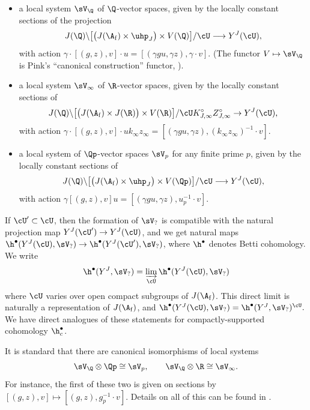 \documentclass[10pt,reqno,a4paper]{amsart}
\newcommand{\subf}{_{\mathrm{f}}}
\begin{document}
\begin{itemize}

\item a local system $\sV_{\Q}$ of $\Q$-vector spaces, given by the locally constant sections of the projection
\[
J(\Q) \backslash\big[\big(J(\A\subf) \times \uhp_{J}\big) \times  V(\Q)\big]/\cU \longrightarrow Y^J(\cU),
\]
with action $\gamma \cdot [(g,z),v] \cdot u = [(\gamma gu, \gamma z), \gamma \cdot v]$. (The functor $V \mapsto \sV_{\Q}$ is Pink's ``canonical construction'' functor, \cite{pink90}).

\item a local system $\sV_{\infty}$ of $\R$-vector spaces, given by the locally constant sections of
\[ J(\Q) \backslash\big[\big(J(\A\subf) \times J(\R)\big) \times  V(\R)\big]/\cU K_{J,\infty}^{\circ} Z_{J,\infty}^{\circ} \to Y^J(\cU),\]
with action $\gamma \cdot [(g,z),v] \cdot u k_\infty z_{\infty} = [(\gamma gu, \gamma z), (k_\infty z_{\infty})^{-1} \cdot v]$.

\item a local system of $\Qp$-vector spaces $\sV_p$ for any finite prime $p$, given by the locally constant sections of
\begin{equation}\label{eq:p-adic local system}
	J(\Q) \backslash\big[\big(J(\A\subf) \times \uhp_{J}\big) \times V(\Qp)\big]/\cU \longrightarrow Y^{J}(\cU),
\end{equation}
with action $\gamma[(g,z),v]u = [(\gamma gu, \gamma z), u_p^{-1} \cdot v]$.
\end{itemize}


If $\cU' \subset \cU$, then the formation of $\sV_?$ is compatible with the natural projection map $Y^J(\cU') \to Y^J(\cU)$, and we get natural maps $\h^\bullet(Y^J(\cU), \sV_?) \to \h^\bullet(Y^J(\cU'), \sV_?)$, where $\h^\bullet$ denotes Betti cohomology.  We write
\[
\h^\bullet(Y^J, \sV_{?}) = \varinjlim_{\cU} \h^\bullet(Y^J(\cU), \sV_{?})
\]
where $\cU$ varies over open compact subgroups of $J(\A\subf)$. This direct limit is naturally a representation of $J(\A\subf)$, and $\h^\bullet(Y^J(\cU),\sV_?) = \h^\bullet(Y^J,\sV_?)^{\cU}.$  We have direct analogues of these statements for compactly-supported cohomology $\h^\bullet_c$.

It is standard that there are canonical isomorphisms of local systems
\begin{equation}\label{eq:local system isos}
\sV_{\Q} \otimes \Qp \cong \sV_p,  \qquad \sV_{\Q} \otimes \R \cong \sV_{\infty}.
\end{equation}
For instance, the first of these two is given on sections by $[(g,z), v] \mapsto [(g,z), g_p^{-1}\cdot v]$. Details on all of this can be found in \cite[\S1.2]{Urb11}.
\end{document}
